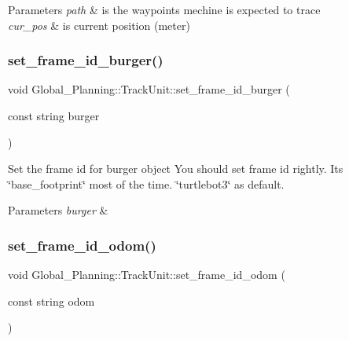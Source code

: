 \begin{DoxyParams}{Parameters}
{\em path} & is the waypoints mechine is expected to trace \\
\hline
{\em cur\+\_\+pos} & is current position (meter) \\
\hline
\end{DoxyParams}
\mbox{\label{class_global___planning_1_1_track_unit_a246c274d23f5e739f35720662b715feb}} 
\subsubsection{\texorpdfstring{set\+\_\+frame\+\_\+id\+\_\+burger()}{set\_frame\_id\_burger()}}
{\footnotesize\ttfamily void Global\+\_\+\+Planning\+::\+Track\+Unit\+::set\+\_\+frame\+\_\+id\+\_\+burger (\begin{DoxyParamCaption}\item[{const string}]{burger }\end{DoxyParamCaption})}



Set the frame id for burger object You should set frame id rightly. It\textquotesingle{}s \char`\"{}base\+\_\+footprint\char`\"{} most of the time. \char`\"{}turtlebot3\char`\"{} as default. 


\begin{DoxyParams}{Parameters}
{\em burger} & \\
\hline
\end{DoxyParams}
\mbox{\label{class_global___planning_1_1_track_unit_a4a59723c0ffef932d43b837f19ac5f76}} 
\subsubsection{\texorpdfstring{set\+\_\+frame\+\_\+id\+\_\+odom()}{set\_frame\_id\_odom()}}
{\footnotesize\ttfamily void Global\+\_\+\+Planning\+::\+Track\+Unit\+::set\+\_\+frame\+\_\+id\+\_\+odom (\begin{DoxyParamCaption}\item[{const string}]{odom }\end{DoxyParamCaption})}



